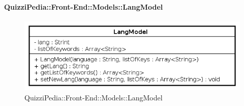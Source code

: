 \paragraph{QuizziPedia::Front-End::Models::LangModel}
		
		\label{QuizziPedia::Front-End::Models::LangModel}
		
		\begin{figure}[ht]
			\centering
			\includegraphics[scale=0.5,keepaspectratio]{UML/Classi/Front-End/QuizziPedia_Front-end_Models_LangModel.png}
			\caption{QuizziPedia::Front-End::Models::LangModel}
		\end{figure} \FloatBarrier
		
